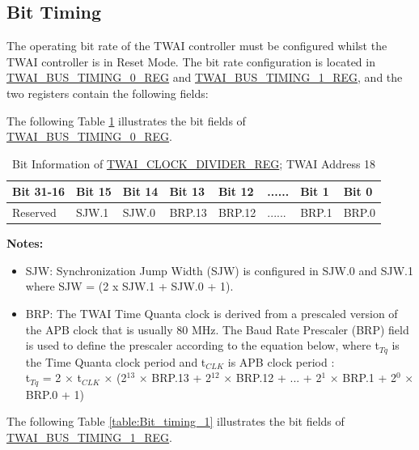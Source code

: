 \documentclass[main\_\_EN.tex]{subfiles}
\begin{document}
\subsection{Bit Timing}
The operating bit rate of the TWAI controller must be configured whilst the TWAI controller is in Reset Mode. The bit rate configuration is located in \hyperref[regdesc:TWAIBUSTIMING0REG]{TWAI\_BUS\_TIMING\_0\_REG} and \hyperref[regdesc:TWAIBUSTIMING1REG]{TWAI\_BUS\_TIMING\_1\_REG}, and the two registers contain the following fields:

The following Table \ref{table:Bit_timing_0} illustrates the bit fields of \hyperref[regdesc:TWAIBUSTIMING0REG]{TWAI\_BUS\_TIMING\_0\_REG}.

\begin{longtable}[c]{|p{2cm}|p{1.5cm}|p{1.5cm}|p{1.5cm}|p{1.5cm}|p{1.5cm}|p{1.5cm}|p{1.5cm}|}
\caption{Bit Information of \hyperref[regdesc:TWAICLOCKDIVIDERREG]{TWAI\_CLOCK\_DIVIDER\_REG}; TWAI Address \hexprefix{}18}
\label{table:Bit_timing_0}\\\hline
\rowcolor{lightgray}
  Bit 31-16 & Bit 15 & Bit 14 & Bit 13 & Bit 12 & ...... & Bit 1 & Bit 0\\\hline
  Reserved & SJW.1 & SJW.0 & BRP.13 & BRP.12 & ...... & BRP.1 & BRP.0\\\hline
\end{longtable}
\vspace{-1.5em}
{\bfseries Notes:}\\
\begin{itemize}
    \item SJW: Synchronization Jump Width (SJW) is configured in SJW.0 and SJW.1 where SJW = (2 x SJW.1 + SJW.0 + 1).
    \item BRP: The TWAI Time Quanta clock is derived from a prescaled version of the APB clock that is usually 80 MHz. The Baud Rate Prescaler (BRP) field is used to define the prescaler according to the equation below, where t$_{Tq}$ is the Time Quanta clock period and t$_{CLK}$ is APB clock period :\\

t$_{Tq}$ = 2 × t$_{CLK}$ × (2$^{13}$ × BRP.13 + 2$^{12}$ × BRP.12 + ... + 2$^1$ × BRP.1 + 2$^0$ × BRP.0 + 1)
\end{itemize}

The following Table \ref{table:Bit_timing_1} illustrates the bit fields of \hyperref[regdesc:TWAIBUSTIMING1REG]{TWAI\_BUS\_TIMING\_1\_REG}.
\end{document}
